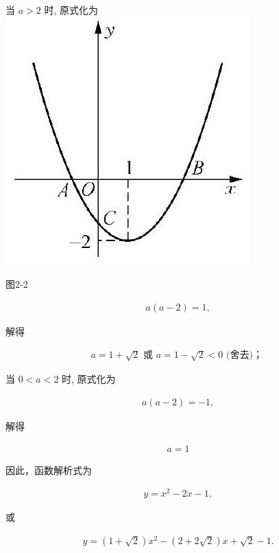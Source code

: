 \documentclass[10pt]{article}
\begin{document}
当 $a>2$ 时, 原式化为\\
\includegraphics[max width=\textwidth, center]{2024_10_30_1bf34f7aeb61f11d11d3g-032}

图2-2

\begin{align*}
a(a-2)=1,
\end{align*}

解得

\begin{align*}
a=1+\sqrt{2} \text { 或 } a=1-\sqrt{2}<0 \text { (舍去)； }
\end{align*}

当 $0<a<2$ 时, 原式化为

\begin{align*}
a(a-2)=-1,
\end{align*}

解得

\begin{align*}
a=1
\end{align*}

因此，函数解析式为

\begin{align*}
y=x^{2}-2 x-1,
\end{align*}

或

\begin{align*}
y=(1+\sqrt{2}) x^{2}-(2+2 \sqrt{2}) x+\sqrt{2}-1 .
\end{align*}
\end{document}
